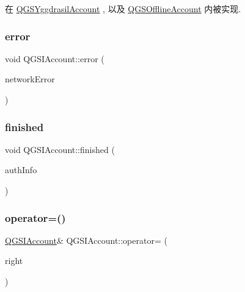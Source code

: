 在 \mbox{\hyperlink{class_q_g_s_yggdrasil_account_a4f61bb0f718f6c4a35bb329e2bd6d09b}{Q\+G\+S\+Yggdrasil\+Account}} , 以及 \mbox{\hyperlink{class_q_g_s_offline_account_af5361c20402584d73ea30a9a75a35bcf}{Q\+G\+S\+Offline\+Account}} 内被实现.

\mbox{\label{class_q_g_s_i_account_ab249a6d5e5f4c05b8c898ac78662cce6}} 
\subsubsection{\texorpdfstring{error}{error}}
{\footnotesize\ttfamily void Q\+G\+S\+I\+Account\+::error (\begin{DoxyParamCaption}\item[{\mbox{\hyperlink{class_q_g_s_network_error}{Q\+G\+S\+Network\+Error}}}]{network\+Error }\end{DoxyParamCaption})\hspace{0.3cm}{\ttfamily [signal]}}

\mbox{\label{class_q_g_s_i_account_a86ec48e8370f87abf2343681aa47f10a}} 
\subsubsection{\texorpdfstring{finished}{finished}}
{\footnotesize\ttfamily void Q\+G\+S\+I\+Account\+::finished (\begin{DoxyParamCaption}\item[{\mbox{\hyperlink{class_q_g_s_auth_info}{Q\+G\+S\+Auth\+Info}}}]{auth\+Info }\end{DoxyParamCaption})\hspace{0.3cm}{\ttfamily [signal]}}

\mbox{\label{class_q_g_s_i_account_ade773adc79026086da24cf4a8b2bb328}} 
\subsubsection{\texorpdfstring{operator=()}{operator=()}\hspace{0.1cm}{\footnotesize\ttfamily [1/2]}}
{\footnotesize\ttfamily \mbox{\hyperlink{class_q_g_s_i_account}{Q\+G\+S\+I\+Account}}\& Q\+G\+S\+I\+Account\+::operator= (\begin{DoxyParamCaption}\item[{const \mbox{\hyperlink{class_q_g_s_i_account}{Q\+G\+S\+I\+Account}} \&}]{right }\end{DoxyParamCaption})\hspace{0.3cm}{\ttfamily [default]}}

